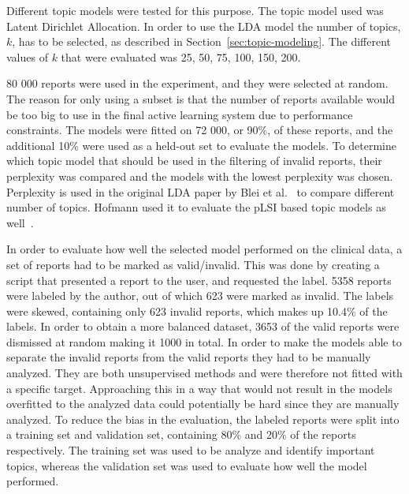 Different topic models were tested for this purpose.
The topic model used was Latent Dirichlet Allocation.
In order to use the LDA model the number of topics, $k$, has to be selected, as described in Section~\ref{sec:topic-modeling}.
The different values of $k$ that were evaluated was 25, 50, 75, 100, 150, 200.

80 000 reports were used in the experiment, and they were selected at random.
The reason for only using a subset is that the number of reports available would be too big to use in the final active learning system due to performance constraints.
The models were fitted on 72 000, or 90\%, of these reports, and the additional 10\% were used as a held-out set to evaluate the models.
To determine which topic model that should be used in the filtering of invalid reports, their perplexity was compared and the models with the lowest perplexity was chosen.
Perplexity is used in the original LDA paper by Blei et al\@.~\cite{blei2003latent} to compare different number of topics.
Hofmann used it to evaluate the pLSI based topic models as well~\cite{hofmann1999probabilistic}.

In order to evaluate how well the selected model performed on the clinical data, a set of reports had to be marked as valid/invalid.
This was done by creating a script that presented a report to the user, and requested the label.
5358 reports were labeled by the author, out of which 623 were marked as invalid. 
The labels were skewed, containing only 623 invalid reports, which makes up 10.4\% of the labels.
In order to obtain a more balanced dataset, 3653 of the valid reports were dismissed at random making it 1000 in total.
In order to make the models able to separate the invalid reports from the valid reports they had to be manually analyzed.
They are both unsupervised methods and were therefore not fitted with a specific target.
Approaching this in a way that would not result in the models overfitted to the analyzed data could potentially be hard since they are manually analyzed. 
To reduce the bias in the evaluation, the labeled reports were split into a training set and validation set, containing 80\% and 20\% of the reports respectively.
The training set was used to be analyze and identify important topics, whereas the validation set was used to evaluate how well the model performed.

